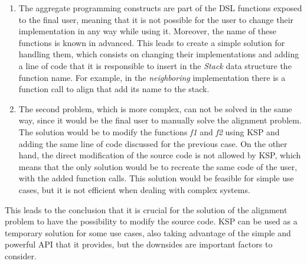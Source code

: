 \begin{enumerate}
    \item The aggregate programming constructs are part of the DSL functions exposed to the final user, meaning that it is not possible for the user to change their implementation in any way while using it. Moreover, the name of these functions is known in advanced. This leads to create a simple solution for handling them, which consists on changing their implementations and adding a line of code that it is responsible to insert in the \textit{Stack} data structure the function name. For example, in the \textit{neighboring} implementation there is a function call to align that add its name to the stack.
    \item The second problem, which is more complex, can not be solved in the same way, since it would be the final user to manually solve the alignment problem. The solution would be to modify the functions \textit{f1} and \textit{f2} using KSP and adding the same line of code discussed for the previous case. On the other hand, the direct modification of the source code is not allowed by KSP, which means that the only solution would be to recreate the same code of the user, with the added function calls. This solution would be feasible for simple use cases, but it is not efficient when dealing with complex systems.
\end{enumerate}
This leads to the conclusion that it is crucial for the solution of the alignment problem to have the possibility to modify the source code. KSP can be used as a temporary solution for some use cases, also taking advantage of the simple and powerful API that it provides, but the downsides are important factors to consider.

